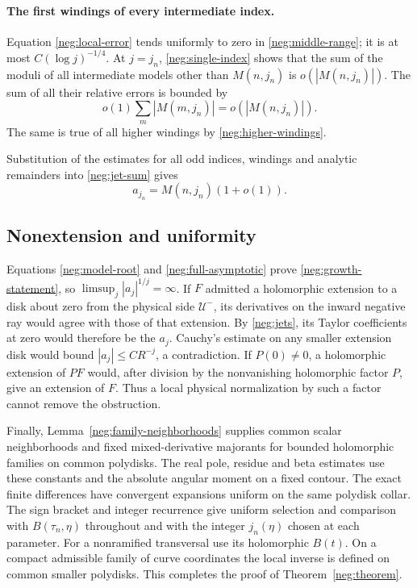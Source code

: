\documentclass[11pt]{article}
\numberwithin{equation}{section}
\theoremstyle{definition}
\begin{document}
\paragraph{The first windings of every intermediate index.}
Equation \eqref{neg:local-error} tends uniformly to zero
in \eqref{neg:middle-range}; it is at most
\(C(\log j)^{-1/4}\).
At \(j=j_n\), \eqref{neg:single-index} shows that the sum
of the moduli of all intermediate models other than
\(M(n,j_n)\) is \(o(|M(n,j_n)|)\).
The sum of all their relative errors is bounded by
\[
 o(1)\sum_m|M(m,j_n)|=o(|M(n,j_n)|).
 \]
The same is true of all higher windings by
\eqref{neg:higher-windings}.

Substitution of the estimates for all odd indices, windings and
analytic remainders into \eqref{neg:jet-sum} gives
\begin{equation}
 a_{j_n}=M(n,j_n)(1+o(1)).
 \label{neg:full-asymptotic}
\end{equation}

\subsection{Nonextension and uniformity}
\label{neg:conclusion}

Equations \eqref{neg:model-root} and
\eqref{neg:full-asymptotic} prove
\eqref{neg:growth-statement}, so
\(\limsup_j|a_j|^{1/j}=\infty\).
If \(F\) admitted a holomorphic extension to a disk about
zero from the physical side \(\mathcal U^-\), its derivatives
on the inward negative ray would agree with those of that
extension.  By \eqref{neg:jets}, its Taylor coefficients at
zero would therefore be the \(a_j\).  Cauchy's estimate on
any smaller extension disk would bound
\(|a_j|\le C R^{-j}\), a contradiction.
If \(P(0)\ne0\), a holomorphic extension of \(PF\) would,
after division by the nonvanishing holomorphic factor
\(P\), give an extension of \(F\).  Thus a local physical
normalization by such a factor cannot remove the obstruction.

Finally, Lemma~\ref{neg:family-neighborhoods} supplies common
scalar neighborhoods and fixed mixed-derivative majorants for bounded
holomorphic families on common polydisks. The real pole, residue
and beta estimates use these constants and the absolute angular
moment on a fixed contour. The exact finite differences have
convergent expansions uniform on the same polydisk collar.
The sign bracket and integer recurrence give uniform selection
and comparison with \(B(\tau_n,\eta)\) throughout and with the
integer \(j_n(\eta)\) chosen at each parameter. For a nonramified
transversal use its holomorphic \(B(t)\). On a compact admissible
family of curve coordinates the local inverse is defined on common
smaller polydisks.
This completes the proof of Theorem~\ref{neg:theorem}.
\end{document}

